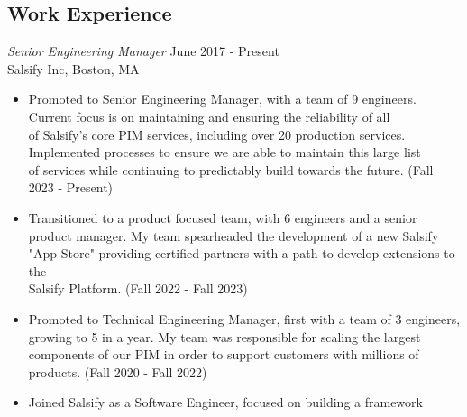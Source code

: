 \documentclass[line,margin]{res}
\begin{document}
\address{399 Pleasant St, Canton MA, 02021}
\address{(563) 581-8229\\ \href{mailto:eric.d.brown23@gmail.com}{eric.d.brown23@gmail.com}}

    \begin{resume}
        \section{Work Experience}
            {\sl Senior Engineering Manager} \hfill June 2017 - Present \\
            Salsify Inc, Boston, MA
                \begin{itemize} \itemsep -2pt %
                    \item Promoted to Senior Engineering Manager, with a team of 9 engineers. \\
                          Current focus is on maintaining and ensuring the reliability of all \\
                          of Salsify's core PIM services, including over 20 production services. \\
                          Implemented processes to ensure we are able to maintain this large list \\
                          of services while continuing to predictably build towards the future. (Fall 2023 - Present)
                    \item Transitioned to a product focused team, with 6 engineers and a senior \\
                          product manager. My team spearheaded the development of a new Salsify \\
                          "App Store" providing certified partners with a path to develop extensions to the \\
                          Salsify Platform. (Fall 2022 - Fall 2023)
                    \item Promoted to Technical Engineering Manager, first with a team of 3 engineers, \\
                          growing to 5 in a year. My team was responsible for scaling the largest \\
                          components of our PIM in order to support customers with millions of products. (Fall 2020 - Fall 2022)
                    \item Joined Salsify as a Software Engineer, focused on building a framework \\

\end{itemize}
\end{resume}
\end{document}
